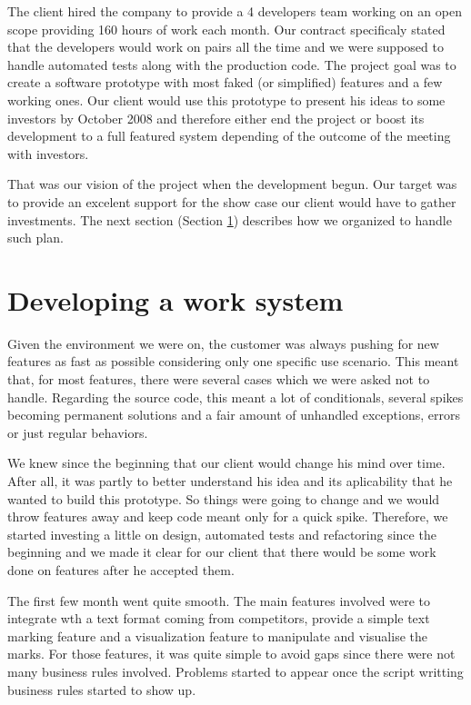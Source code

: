 \documentclass[lnbip]{svmultln}
\begin{document}
The client hired the company to provide a 4 developers team working on
an open scope providing 160 hours of work each month. Our contract
specificaly stated that the developers would work on pairs all the
time and we were supposed to handle automated tests along with the
production code. The project goal was to create a software prototype
with most faked (or simplified) features and a few working ones. Our
client would use this prototype to present his ideas to some investors
by October 2008 and therefore either end the project or boost its
development to a full featured system depending of the outcome of the
meeting with investors.

That was our vision of the project when the development begun. Our
target was to provide an excelent support for the show case our client
would have to gather investments. The next section (Section
\ref{sec:working}) describes how we organized to handle such plan.

\section{Developing a work system}
\label{sec:working}

Given the environment we were on, the customer was always pushing for
new features as fast as possible considering only one specific use
scenario. This meant that, for most features, there were several cases
which we were asked not to handle. Regarding the source code, this
meant a lot of conditionals, several spikes becoming permanent
solutions and a fair amount of unhandled exceptions, errors or just
regular behaviors.

We knew since the beginning that our client would change his mind over
time. After all, it was partly to better understand his idea and its
aplicability that he wanted to build this prototype. So things were
going to change and we would throw features away and keep code meant
only for a quick spike. Therefore, we started investing a little on
design, automated tests and refactoring since the beginning and we
made it clear for our client that there would be some work done on
features after he accepted them.

The first few month went quite smooth. The main features involved were
to integrate wth a text format coming from competitors, provide a
simple text marking feature and a visualization feature to manipulate
and visualise the marks. For those features, it was quite simple to
avoid gaps since there were not many  business rules
involved. Problems started to appear once the script writting business
rules started to show up.
\end{document}
